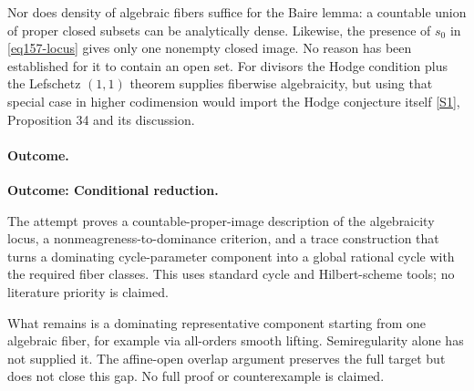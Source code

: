 \documentclass[11pt,a4paper]{article}
\newcommand{\sref}[2]{\hyperlink{source:#1:#2}{[S#2]}}
\numberwithin{equation}{section}
\begin{document}
Nor does density of algebraic fibers suffice for the Baire lemma: a
countable union of proper closed subsets can be analytically dense.
Likewise, the presence of $s_0$ in \eqref{eq157-locus} gives only one
nonempty closed image. No reason has been established for it to contain
an open set. For divisors the Hodge condition plus the Lefschetz
$(1,1)$ theorem supplies fiberwise algebraicity, but using that special
case in higher codimension would import the Hodge conjecture itself
\sref{157}{1}, Proposition 34 and its discussion.

\paragraph{Outcome.}
\textbf{Outcome: Conditional reduction.}

The attempt proves a countable-proper-image description of the algebraicity
locus, a nonmeagreness-to-dominance criterion, and a trace construction that
turns a dominating cycle-parameter component into a global rational cycle
with the required fiber classes. This uses standard cycle and Hilbert-scheme
tools; no literature priority is claimed.

What remains is a dominating representative component starting from one
algebraic fiber, for example via all-orders smooth lifting. Semiregularity
alone has not supplied it. The affine-open overlap argument preserves the
full target but does not close this gap. No full proof or counterexample
is claimed.
\end{document}
